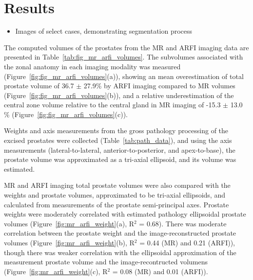 \section{Results}\label{sect:results}

\begin{itemize}
    \item Images of select cases, demonstrating segmentation process
\end{itemize}

The computed volumes of the prostates from the MR and ARFI imaging data are
presented in Table~\ref{tab:fig_mr_arfi_volumes}.  The subvolumes associated
with the zonal anatomy in each imaging modality was measured
(Figure~\ref{fig:fig_mr_arfi_volumes}(a)), showing an mean overestimation of
total prostate volume of 36.7 $\pm$ 27.9\% by ARFI imaging compared to MR
volumes (Figure~\ref{fig:fig_mr_arfi_volumes}(b)), and a relative
underestimation of the central zone volume relative to the central gland in MR
imaging of -15.3 $\pm$ 13.0 \% (Figure~\ref{fig:fig_mr_arfi_volumes}(c)).





Weights and axis measurements from the gross pathology processing of the
excised prostates were collected (Table~\ref{tab:path_data}), and using the
axis measurements (lateral-to-lateral, anterior-to-posterior, and
apex-to-base), the prostate volume was approximated as a tri-axial ellipsoid,
and its volume was estimated.



MR and ARFI imaging total prostate volumes were also compared with the weights
and prostate volumes, approximated to be tri-axial ellipsoids, and calculated
from measurements of the prostate semi-principal axes.  Prostate weights were
moderately correlated with estimated pathology ellipsoidal prostate volumes
(Figure~\ref{fig:mr_arfi_weight}(a), R$^2$ = 0.68).  There was moderate
correlation between the prostate weight and the image-reconstructed prostate
volumes (Figure~\ref{fig:mr_arfi_weight}(b), R$^2$ = 0.44 (MR) and 0.21
(ARFI)), though there was weaker correlation with the ellipsoidal approximation
of the measurement prostate volume and the image-recontructed volumens
(Figure~\ref{fig:mr_arfi_weight}(c), R$^2$ = 0.08 (MR) and 0.01 (ARFI)).  




